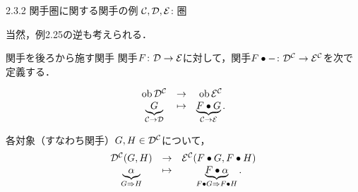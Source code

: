 \documentclass[uplatex,a4paper,dvipdfmx,aspectratio=169,10pt]{beamer}
\begin{document}
\begin{frame}[fragile]{2.3.2 関手圏に関する関手の例}
    $\mathcal{C}, \mathcal{D}, \mathcal{E}$: 圏

    当然，例2.25の逆も考えられる．
    \begin{exampleblock}{ 関手を後ろから施す関手}
        関手$F \colon \mathcal{D} \to \mathcal{E}$に対して，関手$F \bullet - \colon \mathcal{D}^{\mathcal{C}} \to \mathcal{E}^{\mathcal{C}}$を次で定義する．
        \begin{description}[対象への作用:]
            \item[対象への作用:]
                \begin{equation*}
                    \begin{array}{ccc}
                        \operatorname{{\mathrm{ob}}} \mathcal{D}^{\mathcal{C}} & \to & \operatorname{{\mathrm{ob}}} \mathcal{E}^{\mathcal{C}}  \\
                        \underbrace{G}_{\mathcal{C} \to \mathcal{D}} & \mapsto & \underbrace{F \bullet G}_{\mathcal{C} \to \mathcal{E}}.
                    \end{array}
                \end{equation*}
            \item[射への作用:] 各対象（すなわち関手）$G, H \in \mathcal{D}^{\mathcal{C}}$について，
                \begin{equation*}
                    \begin{array}{ccc}
                        \mathcal{D}^{\mathcal{C}}(G, H) & \to & \mathcal{E}^{\mathcal{C}}(F \bullet G, F \bullet H)  \\
                        \underbrace{\alpha}_{G \Rightarrow H} & \mapsto & \underbrace{F \bullet \alpha}_{F \bullet G \Rightarrow F \bullet H}.
                    \end{array}
                \end{equation*}
        \end{description}
    \end{exampleblock}
\end{frame}
\end{document}

